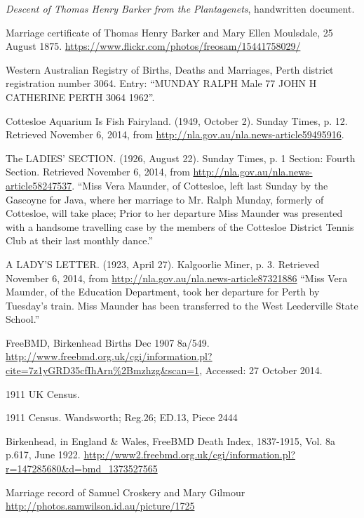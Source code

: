 \begin{thebibliography}{99}
	\emph{Descent of Thomas Henry Barker from the Plantagenets},
	handwritten document.

	Marriage certificate of Thomas Henry Barker and Mary Ellen Moulsdale, 25 August 1875.
	\url{https://www.flickr.com/photos/freosam/15441758029/}

	 Western Australian Registry of Births, Deaths and Marriages, Perth district registration number 3064.
	 Entry: ``MUNDAY RALPH 	Male 	77 	JOHN H 	CATHERINE 		PERTH 	3064 	1962''.

    Cottesloe Aquarium Is Fish Fairyland.
    (1949, October 2). Sunday Times, p. 12. Retrieved November 6, 2014,
    from \url{http://nla.gov.au/nla.news-article59495916}.

	The LADIES' SECTION. (1926, August 22). Sunday Times, p. 1 Section: Fourth Section.
	Retrieved November 6, 2014, from \url{http://nla.gov.au/nla.news-article58247537}.
	``Miss Vera Maunder, of Cottesloe, left last Sunday by the Gascoyne for Java, where her marriage to Mr. Ralph Munday, formerly of Cottesloe, will take place; Prior to her departure Miss Maunder was presented with a handsome travelling case by the members of the Cottesloe District Tennis Club at their last monthly dance.''

	A LADY'S LETTER. (1923, April 27). Kalgoorlie Miner, p. 3.
	Retrieved November 6, 2014, from \url{http://nla.gov.au/nla.news-article87321886}
	``Miss Vera Maunder, of the Education Department, took her departure for Perth by Tuesday's train.
	Miss Maunder has been transferred to the West Leederville State School.''

	FreeBMD, Birkenhead Births Dec 1907 8a/549.
	\url{http://www.freebmd.org.uk/cgi/information.pl?cite=7z1yGRD35cfIhArn\%2Bmzhzg&scan=1}, Accessed: 27 October 2014.

	1911 UK Census.

	1911 Census. Wandsworth; Reg.26; ED.13, Piece 2444

	Birkenhead, in England \& Wales, FreeBMD Death Index, 1837-1915, Vol. 8a p.617, June 1922.
	\url{http://www2.freebmd.org.uk/cgi/information.pl?r=147285680&d=bmd_1373527565}

	Marriage record of Samuel Croskery and Mary Gilmour
	\url{http://photos.samwilson.id.au/picture/1725}


\end{thebibliography}

